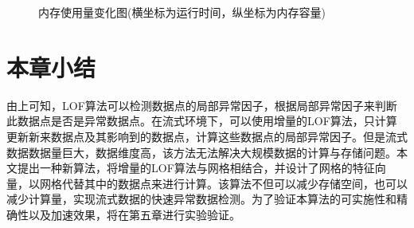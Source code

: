 \begin{figure}[htbp]
	\centering                                      %
	\caption{内存使用量变化图(横坐标为运行时间，纵坐标为内存容量)} %
	\label{fig:fig37}                                       %
\end{figure}

\section{本章小结}
由上可知，LOF算法可以检测数据点的局部异常因子，根据局部异常因子来判断此数据点是否是异常数据点。在流式环境下，可以使用增量的LOF算法，只计算更新新来数据点及其影响到的数据点，计算这些数据点的局部异常因子。但是流式数据数据量巨大，数据维度高，该方法无法解决大规模数据的计算与存储问题。本文提出一种新算法，将增量的LOF算法与网格相结合，并设计了网格的特征向量，以网格代替其中的数据点来进行计算。该算法不但可以减少存储空间，也可以减少计算量，实现流式数据的快速异常数据检测。为了验证本算法的可实施性和精确性以及加速效果，将在第五章进行实验验证。
